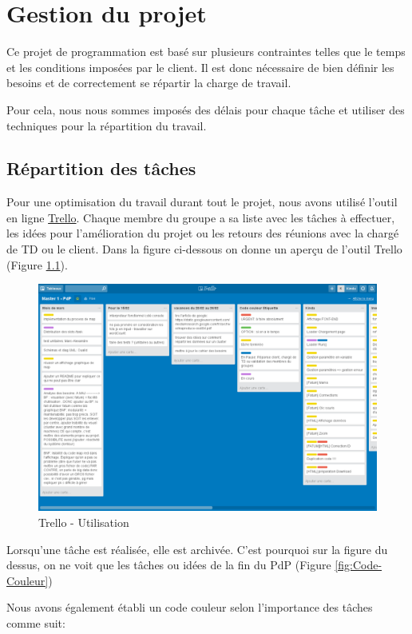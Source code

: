\chapter{Gestion du projet}

Ce projet de programmation est basé sur plusieurs contraintes telles que le temps et les conditions imposées par le client. Il est donc nécessaire de bien définir les besoins et de correctement se répartir la charge de travail.

Pour cela, nous nous sommes imposés des délais pour chaque tâche et utiliser des techniques pour la répartition du travail.

\section{Répartition des tâches}
Pour une optimisation du travail durant tout le projet, nous avons utilisé l'outil en ligne \href{http://www.trello.com/}{Trello}.
Chaque membre du groupe a sa liste avec les tâches à effectuer, les idées pour l'amélioration du projet ou les retours des réunions avec la chargé de TD ou le client.
Dans la figure ci-dessous on donne un aperçu de l'outil Trello (Figure \ref{fig:Tache-pdp}).

\begin{figure}[H]
  \centering
    \includegraphics[width=1\textwidth]{images/trello.png}
        \caption{Trello - Utilisation}
        \label{fig:Tache-pdp}
\end{figure}
Lorsqu'une tâche est réalisée, elle est archivée. C'est pourquoi sur la figure du dessus, on ne voit que les tâches ou idées de la fin du PdP (Figure \ref{fig:Code-Couleur})

Nous avons également établi un code couleur selon l'importance des tâches comme suit:

